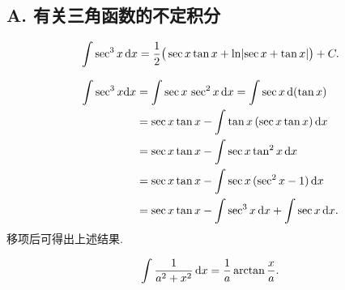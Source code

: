 \documentclass[a4paper,10pt,fleqn]{article}
\begin{document}
\subsection*{A. 有关三角函数的不定积分}

\begin{equation}
    \int\sec^3x\,{\rm d}x=\frac{1}{2}\big(\sec x\tan x+\ln \lvert\sec x+\tan x\rvert\big)+C.
\end{equation}
\begin{prof}
    \begin{align*}
        \int\sec^3x{\rm d}x & =\int\sec x\,\sec^2x\,{\rm d}x=\int\sec x\,{\rm d}(\tan x) \\
                            & =\sec x\tan x-\int\tan x\,(\sec x\tan x)\,{\rm d}x         \\
                            & =\sec x\tan x-\int\sec x\tan^2x\,{\rm d}x                  \\
                            & =\sec x\tan x-\int\sec x\,(\sec^2x-1)\,{\rm d}x            \\
                            & =\sec x\tan x-\int\sec^3x\,{\rm d}x+\int\sec x\,{\rm d}x.
    \end{align*}
    移项后可得出上述结果.
\end{prof}

\begin{equation}
    \int\frac{1}{a^2+x^2}\,{\rm d}x=\frac{1}{a}\arctan\frac{x}{a}.
\end{equation}
\end{document}
